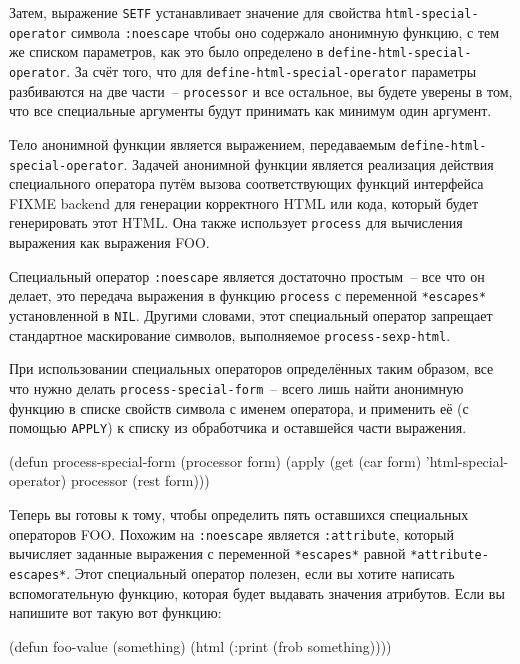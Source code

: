 Затем, выражение \lstinline{SETF} устанавливает значение для свойства
\lstinline{html-special-operator} символа \lstinline{:noescape} чтобы оно содержало анонимную
функцию, с тем же списком параметров, как это было определено в
\lstinline{define-html-special-operator}.  За счёт того, что для
\lstinline{define-html-special-operator} параметры разбиваются на две части~-- \lstinline{processor}
и все остальное, вы будете уверены в том, что все специальные аргументы будут принимать
как минимум один аргумент.

Тело анонимной функции является выражением, передаваемым
\lstinline{define-html-special-operator}.  Задачей анонимной функции является реализация
действия специального оператора путём вызова соответствующих функций интерфейса FIXME
backend для генерации корректного HTML или кода, который будет генерировать этот HTML.
Она также использует \lstinline{process} для вычисления выражения как выражения FOO.

Специальный оператор \lstinline{:noescape} является достаточно простым~-- все что он делает,
это передача выражения в функцию \lstinline{process} с переменной \lstinline{*escapes*}
установленной в \lstinline{NIL}.  Другими словами, этот специальный оператор запрещает
стандартное маскирование символов, выполняемое \lstinline{process-sexp-html}.

При использовании специальных операторов определённых таким образом, все что нужно делать
\lstinline{process-special-form}~-- всего лишь найти анонимную функцию в списке свойств символа
с именем оператора, и применить её (с помощью \lstinline{APPLY}) к списку из обработчика и
оставшейся части выражения.

\begin{myverb}
(defun process-special-form (processor form)
  (apply (get (car form) 'html-special-operator) processor (rest form)))
\end{myverb}

Теперь вы готовы к тому, чтобы определить пять оставшихся специальных операторов FOO.
Похожим на \lstinline{:noescape} является \lstinline{:attribute}, который вычисляет заданные
выражения с переменной \lstinline{*escapes*} равной \lstinline{*attribute-escapes*}.  Этот
специальный оператор полезен, если вы хотите написать вспомогательную функцию, которая
будет выдавать значения атрибутов.  Если вы напишите вот такую вот функцию:

\begin{myverb}
(defun foo-value (something)
  (html (:print (frob something))))
\end{myverb}

